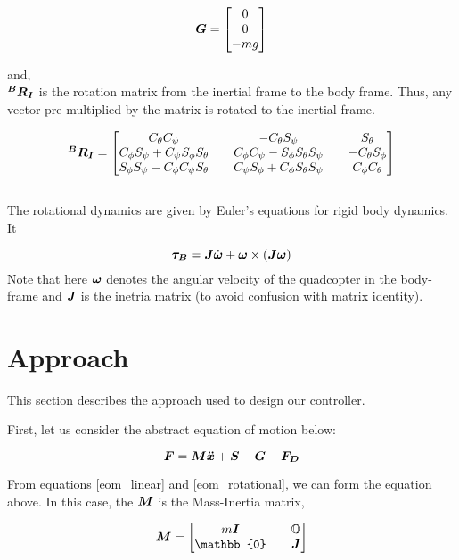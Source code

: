 \documentclass[12pt,fleqn]{article}
\newcommand{\mbm}[1]{\mbox{\boldmath $#1$}}
\begin{document}
$$ \mbm{G} = \begin{bmatrix} 0 \\ 0 \\ -mg \end{bmatrix} $$

and,\\ 

$ \mbm{^BR_I} $ is the rotation matrix from the inertial frame to the
body frame. Thus, any vector pre-multiplied by the matrix is
rotated to the inertial frame.

$$ \mbm{^BR_I} = \begin{bmatrix} C_\theta C_\psi && -C_\theta S_\psi && S_\theta\\
C_\phi S_\psi + C_\psi S_\phi S_\theta&& C_\phi C_\psi - S_\phi
S_\theta S_\psi&& -C_\theta S_\phi\\
S_\phi S_\psi - C_\phi C_\psi S_\theta&&
C_\psi S_\phi + C_\phi S_\theta S_\psi&&
C_\phi C_\theta \end{bmatrix} $$
\\

The rotational dynamics are given by Euler's equations for rigid body
dynamics. It

\begin{equation} \label{eom_rotational}
\mbm{\tau_B} = \mbm{J\dot{\omega}} + \mbm{\omega} \times (\mbm{J\omega})
\end{equation}
Note that here $\mbm{\omega}$ denotes the angular velocity of the
quadcopter in the body-frame and $\mbm{J}$ is the inetria matrix (to
avoid confusion with matrix identity).

\section{Approach}
This section describes the approach used to design our controller.

First, let us consider the abstract equation of motion below:

\begin{equation} \label{eom_abstract}
$$ \mbm{F} = \mbm{M}\mbm{\ddot{x}} + \mbm{S} -\mbm{G} - \mbm{F_D} $$
\end{equation}

From equations \ref{eom_linear} and \ref{eom_rotational}, we can form
the equation above. In this case, the $\mbm{M}$ is the Mass-Inertia
matrix, 

$$ \mbm{M} = \begin{bmatrix} m\mbm{I} && \mathbb{O}\\ \mathbb{0}&&
  \mbm{J}\end{bmatrix} $$
\end{document}
